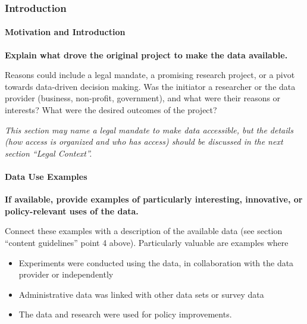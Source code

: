 \documentclass[
]{WileySix}
\providecommand{\tightlist}{%
  \setlength{\itemsep}{0pt}\setlength{\parskip}{0pt}}
\begin{document}
\hypertarget{introduction-10}{%
\subsubsection*{Introduction}\label{introduction-10}}

\hypertarget{motivation-and-introduction}{%
\paragraph{Motivation and Introduction}\label{motivation-and-introduction}}

\textbf{Explain what drove the original project to make the data available.}

Reasons could include a legal mandate, a promising research project, or a pivot towards data-driven decision making. Was the initiator a researcher or the data provider (business, non-profit, government), and what were their reasons or interests? What were the desired outcomes of the project?

\emph{This section may name a legal mandate to make data accessible, but the details (how access is organized and who has access) should be discussed in the next section ``Legal Context''.}

\hypertarget{data-use-examples-9}{%
\paragraph{Data Use Examples}\label{data-use-examples-9}}

\textbf{If available, provide examples of particularly interesting, innovative, or policy-relevant uses of the data.}

Connect these examples with a description of the available data (see section ``content guidelines'' point 4 above). Particularly valuable are examples where

\begin{itemize}
\tightlist
\item
  Experiments were conducted using the data, in collaboration with the data provider or independently
\item
  Administrative data was linked with other data sets or survey data
\item
  The data and research were used for policy improvements.
\end{itemize}
\end{document}
